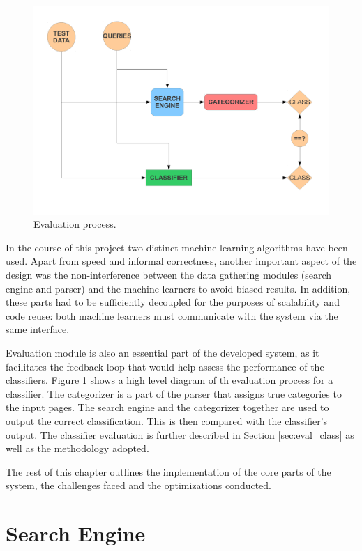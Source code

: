 \documentclass[12pt,notitlepage,twoside]{scrreprt}
\begin{document}
\begin{figure}[h]
\centering
\includegraphics[width=\textwidth]{figs/eval.pdf}
\caption{Evaluation process. }
\label{eval}
\end{figure}

In the course of this project two distinct machine learning algorithms have been used.
Apart from speed and informal correctness, another important aspect of the design was the
non-interference between the data gathering modules (search engine and parser) and the
machine learners to avoid biased results. In addition, these parts had to be sufficiently
decoupled for the purposes of scalability and code reuse: both machine learners must
communicate with the system via the same interface. 

Evaluation module is also an essential part of the developed system, as it facilitates the
feedback loop that would help assess the performance of the classifiers. Figure \ref{eval}
shows a high level diagram of th evaluation process for a classifier. The categorizer is
a part of the parser that assigns true categories to the input pages. The search engine
and the categorizer together are used to output the correct classification. This is then
compared with the classifier's output. The classifier evaluation is further described in
Section \ref{sec:eval_class} as well as the methodology adopted.

The rest of this chapter outlines the implementation of the core parts of the system, the
challenges faced and the optimizations conducted.
\section{Search Engine}
\end{document}
